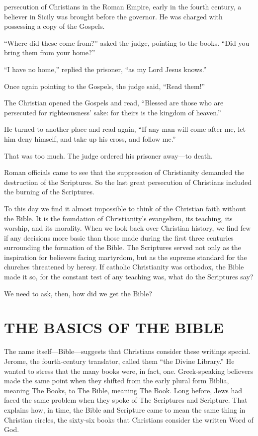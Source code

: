 
 persecution of Christians in the Roman Empire, early in the fourth
century, a believer in Sicily was brought before the governor. He was charged with possessing a copy
of the Gospels.

“Where did these come from?” asked the judge, pointing to the books. “Did you bring them from your
home?”

“I have no home,” replied the prisoner, “as my Lord Jesus knows.”

Once again pointing to the Gospels, the judge said, “Read them!”

The Christian opened the Gospels and read, “Blessed are those who are persecuted for righteousness’
sake: for theirs is the kingdom of heaven.”

He turned to another place and read again, “If any man will come after me, let him deny himself, and
take up his cross, and follow me.”

That was too much. The judge ordered his prisoner away—to death.

Roman officials came to see that the suppression of Christianity demanded the destruction of the
Scriptures. So the last great persecution of Christians included the burning of the Scriptures.

To this day we find it almost impossible to think of the Christian faith without the Bible. It is
the foundation of Christianity’s evangelism, its teaching, its worship, and its morality. When we
look back over Christian history, we find few if any decisions more basic than those made during the
first three centuries surrounding the formation of the Bible. The Scriptures served not only as the
inspiration for believers facing martyrdom, but as the supreme standard for the churches threatened
by heresy. If catholic Christianity was orthodox, the Bible made it so, for the constant test of any
teaching was, what do the Scriptures say?

We need to ask, then, how did we get the Bible?

\section{THE BASICS OF THE BIBLE}

The name itself—Bible—suggests that Christians consider these writings special. Jerome, the
fourth-century translator, called them “the Divine Library.” He wanted to stress that the many books
were, in fact, one. Greek-speaking believers made the same point when they shifted from the early
plural form Biblia, meaning The Books, to The Bible, meaning The Book. Long before, Jews had faced
the same problem when they spoke of The Scriptures and Scripture. That explains how, in time, the
Bible and Scripture came to mean the same thing in Christian circles, the sixty-six books that
Christians consider the written Word of God.

